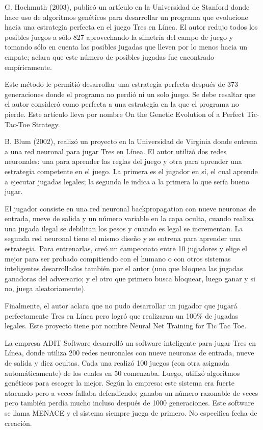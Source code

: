 

 G. Hochmuth (2003), publicó un artículo en la Universidad de Stanford donde 
hace uso de algoritmos genéticos para desarrollar un programa que evolucione hacia 
una estrategia perfecta en el juego Tres en Línea. El autor redujo todos los posibles 
juegos a sólo 827 aprovechando la simetría del campo de juego y tomando sólo en 
cuenta las posibles jugadas que lleven por lo menos hacia un empate; aclara que este 
número de posibles jugadas fue encontrado empíricamente.  

 Este método le permitió desarrollar una estrategia perfecta después de 373 
generaciones donde el programa no perdió ni un solo juego. Se debe resaltar que el 
autor consideró como perfecta a una estrategia en la que el programa no pierde. Este 
artículo lleva por nombre On the Genetic Evolution of a Perfect Tic-Tac-Toe 
Strategy. 

 B. Blum (2002), realizó un proyecto en la Universidad de Virginia donde 
entrena a una red neuronal para jugar Tres en Línea. El autor utilizó dos redes 
neuronales: una para aprender las reglas del juego y otra para aprender una estrategia 
competente en el juego. La primera es el jugador en sí, el cual aprende a ejecutar 
jugadas legales; la segunda le indica a la primera lo que sería bueno jugar.  

 El jugador consiste en una red neuronal backpropagation con nueve neuronas 
de entrada, nueve de salida y un número variable en la capa oculta, cuando realiza 
una jugada ilegal se debilitan los pesos y cuando es legal se incrementan. La segunda 
red neuronal tiene el mismo diseño y se entrena para aprender una estrategia. Para 
entrenarlas, creó un campeonato entre 10 jugadores y elige el mejor para ser probado 
compitiendo con el humano o con otros sistemas inteligentes desarrollados también 
por el autor (uno que bloquea las jugadas ganadoras del adversario; y el otro que 
primero busca bloquear, luego ganar y si no, juega aleatoriamente). 

 Finalmente, el autor aclara que no pudo desarrollar un jugador que jugará 
perfectamente Tres en Línea pero logró que realizaran un 100\% de jugadas legales. 
Este proyecto tiene por nombre Neural Net Training for Tic Tac Toe. 

 La empresa ADIT Software desarrolló un software inteligente para jugar Tres 
en Línea, donde utiliza 200 redes neuronales con nueve neuronas de entrada, nueve 
de salida y diez ocultas. Cada una realizó 100 juegos (con otra asignada 
automáticamente) de los cuales en 50 comenzaba. Luego, utilizó algoritmos genéticos 
para escoger la mejor. Según la empresa: este sistema era fuerte atacando pero a 
veces fallaba defendiendo; ganaba un número razonable de veces pero también perdía 
mucho incluso después de 1000 generaciones. Este software se llama MENACE y el 
sistema siempre juega de primero. No especifica fecha de creación. 
 
